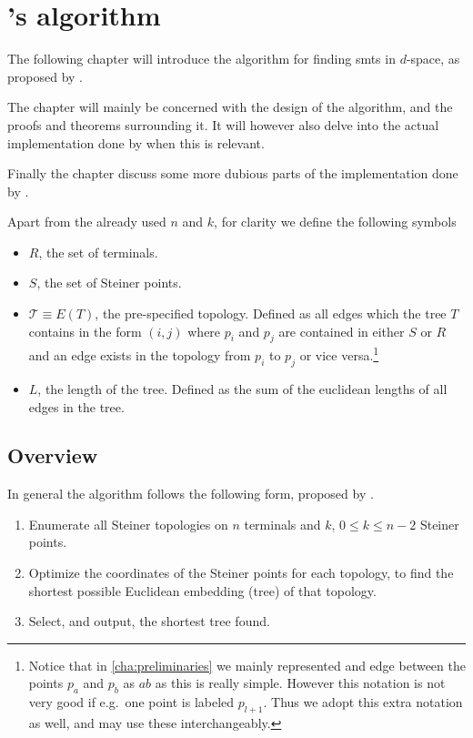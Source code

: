 { \abnormalparskip{0pt}
\chapter{\citeauthor{smith1992}'s algorithm}
\label{cha:algorithm} }


The following chapter will introduce the algorithm for finding \acp{smt} in
$d$-space, as proposed by \textcite{smith1992}.

The chapter will mainly be concerned with the design of the algorithm, and the
proofs and theorems surrounding it. It will however also delve into the actual
implementation done by \citeauthor{smith1992} when this is relevant.

Finally the chapter discuss some more dubious parts of the implementation done
by \citeauthor{smith1992}.

Apart from the already used $n$ and $k$, for clarity we define the following symbols
%
\begin{itemize}
\item $R$, the set of terminals.
\item $S$, the set of Steiner points.
\item $\mathcal{T} \equiv E(T)$, the pre-specified topology. Defined as all
  edges which the tree $T$ contains in the form $(i, j)$ where $p_i$ and
  $p_j$ are contained in either $S$ or $R$ and an edge exists in the
  topology from $p_i$ to $p_j$ or vice versa.\footnote{Notice that in
    \cref{cha:preliminaries} we mainly represented and edge between the points
    $p_a$ and $p_b$ as $ab$ as this is really simple. However this notation is not
    very good if e.g.\ one point is labeled $p_{l+1}$. Thus we adopt this extra
    notation as well, and may use these interchangeably.}
\item $L$, the length of the tree. Defined as the sum of the euclidean lengths
of all edges in the tree.
\end{itemize}

\section{Overview}
\label{sec:overview}

In general the algorithm follows the following form, proposed by \textcite{gilbert1968}.

\begin{enumerate}
\item Enumerate all Steiner topologies on $n$ terminals and $k$, $0 \le k \le
n-2$ Steiner points.
\item Optimize the coordinates of the Steiner points for each topology, to find
the shortest possible Euclidean embedding (tree) of that topology.
\item Select, and output, the shortest tree found.
\end{enumerate}

